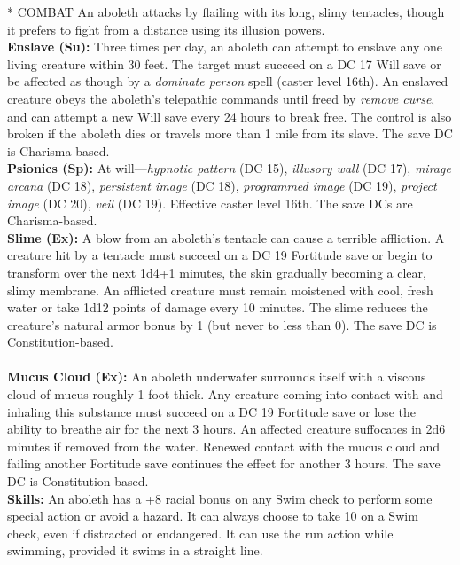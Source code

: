 \documentclass[DIV=14, paper=a4, fontsize=10pt, twocolumn, twoside]{scrartcl}
\makeatletter
\let\origsection\section
\renewcommand\section{\@ifstar{\starsection}{\nostarsection}}
\newcommand\nostarsection[1]
{\origsection{#1}\vspace{-0.5em}}
\newcommand\starsection[1]
{\vspace{-0.5cm}\origsection*{#1}\vspace{-0.3cm}}
\newcommand\invisiblesection[1]{%
  \refstepcounter{section}%
  \sectionmark{#1}
}
\newcommand\listsection[2]{%
	\invisiblesection{#2}
	\section*{\color{dndblue} #1}
}
\renewcommand\thesection{}
\makeatother
\begin{document}
\listsection{COMBAT}
\noindent{An aboleth attacks by flailing with its long, slimy tentacles, though it prefers to fight from a distance using its illusion powers.}\\
\indent\textbf{Enslave (Su):} Three times per day, an aboleth can attempt to enslave any one living creature within 30 feet. The target must succeed on a DC 17 Will save or be affected as though by a \textit{dominate person} spell (caster level 16th). An enslaved creature obeys the aboleth’s telepathic commands until freed by \textit{remove curse}, and can attempt a new Will save every 24 hours to break free. The control is also broken if the aboleth dies or travels more than 1 mile from its slave. The save DC is Charisma-based. \\
\indent\textbf{Psionics (Sp):} At will—\textit{hypnotic pattern} (DC 15), \textit{illusory wall} (DC 17), \textit{mirage arcana} (DC 18), \textit{persistent image} (DC 18), \textit{programmed image} (DC 19), \textit{project image} (DC 20), \textit{veil} (DC 19). Effective caster level 16th. The save DCs are Charisma-based. \\
\indent\textbf{Slime (Ex):} A blow from an aboleth’s tentacle can cause a terrible affliction. A creature hit by a tentacle must succeed on a DC 19 Fortitude save or begin to transform over the next 1d4+1 minutes, the skin gradually becoming a clear, slimy membrane. An afflicted creature must remain moistened with cool, fresh water or take 1d12 points of damage every 10 minutes. The slime reduces the creature’s natural armor bonus by 1 (but never to less than 0). The save DC is Constitution-based.\\
\\
\indent\textbf{Mucus Cloud (Ex):} An aboleth underwater surrounds itself with a viscous cloud of mucus roughly 1 foot thick. Any creature coming into contact with and inhaling this substance must succeed on a DC 19 Fortitude save or lose the ability to breathe air for the next 3 hours. An affected creature suffocates in 2d6 minutes if removed from the water. Renewed contact with the mucus cloud and failing another Fortitude save continues the effect for another 3 hours. The save DC is Constitution-based.\\
\indent\textbf{Skills:} An aboleth has a +8 racial bonus on any Swim check to perform some special action or avoid a hazard. It can always choose to take 10 on a Swim check, even if distracted or endangered. It can use the run action while swimming, provided it swims in a straight line.
\end{document}
